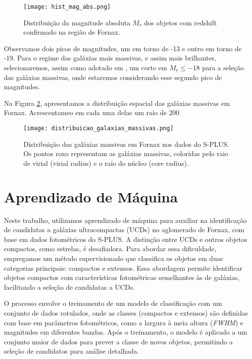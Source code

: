 \begin{figure}[!ht]
    \centering
    \texttt{[image: hist\_mag\_abs.png]}
    \caption[]{Distribuição da magnitude absoluta $M_r$ dos objetos com redshift confirmado na região de Fornax.}
    \label{hist_mag_abs}
\end{figure}

Observamos dois picos de magnitudes, um em torno de -13 e outro em torno de -19. Para o regime das galáxias mais massivas, e assim mais brilhantes, selecionaremos, assim como adotado em \cite{Saifollahi_2021}, um corte em $M_r \leq -18$ para a seleção das galáxias massivas, onde estaremos considerando esse segundo pico de magnitudes.


Na Figura \ref{distribuicao_galaxias_massivas}, apresentamos a distribuição espacial das galáxias massivas em Fornax. Acrescentameo em cada uma delas um raio de 200

\begin{figure}[!ht]
    \centering
    \texttt{[image: distribuicao\_galaxias\_massivas.png]}
    \caption[]{Distribuição das galáxias massivas em Fornax nos dados do S-PLUS. Os pontos roxo representam as galáxias massivas, coloridas pelo raio de virial (virial radius) e o raio do núcleo (core radius).}
    \label{distribuicao_galaxias_massivas}
\end{figure}




\section{Aprendizado de Máquina}\label{sec:aprendizado_maquina}

Neste trabalho, utilizamos aprendizado de máquina para auxiliar na identificação de candidatas a galáxias ultracompactas (UCDs) no aglomerado de Fornax, com base em dados fotométricos do S-PLUS. A distinção entre UCDs e outros objetos compactos, como estrelas, é desafiadora. Para abordar essa dificuldade, empregamos um método supervisionado que classifica os objetos em duas categorias principais: compactos e extensos. Essa abordagem permite identificar objetos compactos com características fotométricas semelhantes às de galáxias, facilitando a seleção de candidatas a UCDs.

O processo envolve o treinamento de um modelo de classificação com um conjunto de dados rotulados, onde as classes (compactos e extensos) são definidas com base em parâmetros fotométricos, como a largura à meia altura (\textit{FWHM}) e magnitudes em diferentes bandas. Após o treinamento, o modelo é aplicado a um conjunto maior de dados para prever a classe de novos objetos, permitindo a seleção de candidatos para análise detalhada.

